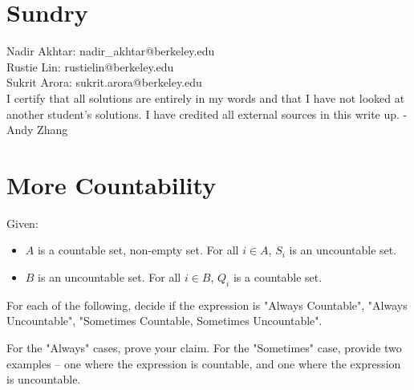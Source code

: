 \documentclass[11pt]{article}
\newcommand*{\Question}[1]{\section{#1}}
\begin{document}
\Question{Sundry} 
\vspace{10pt}
\noindent Nadir Akhtar: nadir\_akhtar@berkeley.edu\\
Rustie Lin: rustielin@berkeley.edu\\
Sukrit Arora: sukrit.arora@berkeley.edu\\

I certify that all solutions are entirely in my words and that I have not looked at another student’s
solutions. I have credited all external sources in this write up. - Andy Zhang
\vfill\pagebreak[3]

\Question{More Countability}

Given:
\begin{itemize}
\item $A$ is a countable set, non-empty set. For all $i \in A$, $S_i$ is an uncountable set.
\item $B$ is an uncountable set. For all $i \in B$, $Q_i$ is a countable set.
\end{itemize}

For each of the following, decide if the expression is
"Always Countable", "Always Uncountable", "Sometimes Countable,
Sometimes Uncountable".

For the "Always" cases, prove your claim. For the "Sometimes" case, provide
two examples -- one where the expression is countable, and one where
the expression is uncountable.
\end{document}
